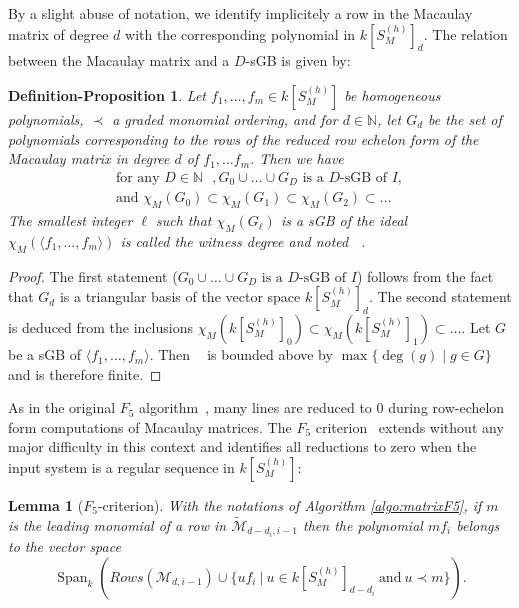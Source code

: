 \documentclass[12pt]{article}
\numberwithin{equation}{section}
\numberwithin{theorem}{section}
\newtheorem{defprop}[theorem]{Definition-Proposition}
\newtheorem{lemma}[theorem]{Lemma}
\DeclareMathOperator{\Span}{Span}
\newcommand{\sgp}{S}
\DeclareMathOperator{\dwit}{d_{wit}}
\newcommand{\N}{\mathbb{N}}
\begin{document}
By a slight abuse of notation, we identify implicitely a row in the Macaulay matrix of degree $d$ with the corresponding polynomial in $k[\sgp_M^{(h)}]_d$. The relation between the Macaulay matrix and a $D$-sGB is given by:
\begin{defprop}\label{defprop:dwit}
Let $f_1,\ldots, f_m\in k[S_M^{(h)}]$ be homogeneous polynomials, $\prec$ a graded monomial ordering, and for $d\in\N$, let $G_d$ be the set of polynomials corresponding to the rows of the reduced row echelon form of the Macaulay matrix in degree $d$ of $f_1,\ldots f_m$. Then we have
$$\begin{array}{c}
\text{for any $D\in\N$ }, G_0\cup \dots\cup G_D\text{ is a $D$-sGB of $I$},\\
\text{and }\chi_M(G_0)\subset\chi_M(G_1)\subset\chi_M(G_2)\subset \dots
\end{array}$$
The smallest integer $\ell$ such that $\chi_M(G_\ell)$ is a sGB of the ideal $\chi_M(\langle f_1,\ldots, f_m\rangle)$ is called \emph{the witness degree} and noted $\dwit$. 
\end{defprop}

\begin{proof}
The first statement ($G_0\cup \dots\cup G_D\text{ is a $D$-sGB of
  $I$}$) follows from the fact that $G_d$ is a triangular basis of the
vector space $k[S_M^{(h)}]_d$. The second statement is deduced from
the inclusions $\chi_M(k[S_M^{(h)}]_0)\subset
\chi_M(k[S_M^{(h)}]_1)\subset\dots$. Let $G$ be a sGB of $\langle f_1,\ldots, f_m\rangle$. Then $\dwit$ is bounded above by $\max\{\deg(g)\mid g\in G\}$ and is therefore finite.
\end{proof}

As in the original $F_5$ algorithm~\cite{Fau02a}, many lines are reduced to 0 during row-echelon form computations of Ma\-cau\-lay matrices. The $F_5$ criterion~\cite{Fau02a,EF14}\cite[Prop.~6]{BFS13} extends without any major difficulty in this context and identifies all reductions to zero when the input system is a regular sequence in $k[\sgp_M^{(h)}]$:
\begin{lemma}[$F_5$-criterion]\label{lem:F5crit}
  With the notations of Algorithm \ref{algo:matrixF5}, 
  if \(m\) is the leading monomial of a row in $\widetilde{\mathcal{M}}_{d-d_i,i-1}$ then the polynomial $m f_i$ belongs to the vector space \[
  \Span_k(Rows(\mathcal{M}_{d,i-1}) \cup \{uf_i \ | \ u \in k[\sgp_M^{(h)}]_{d-d_i} \ \text{and}\ u\prec m\}).
\]
\end{lemma}
\end{document}
